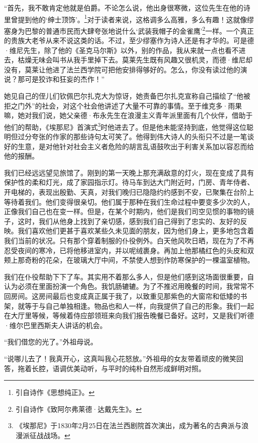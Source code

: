 \par “首先，我不敢肯定他就是伯爵。不论怎么说，他出身很寒微，这位先生在他的诗里曾提到他的‘绅士顶饰’。\footnote{引自诗作《思想纯正》。}对于读者来说，这格调多么高雅，多么有趣！这就像缪塞身为巴黎的普通市民而大肆夸张地说什么‘武装我帽子的金雀鹰’\footnote{引自诗作《致阿尔弗莱德·达戴先生》。}一样。一个真正的贵族大老爷从来不说这类的话。不过，至少缪塞作为诗人还是有才华的。可是德·维尼先生，除了他的《圣克马尔斯》以外，别的作品，我从来就一点也看不进去，枯燥无味会叫书从我手里掉下去。莫莱先生既有风趣又很机灵，而德·维尼却没有，莫莱让他进了法兰西学院可把他安排得够好的。怎么，你没有读过他的演说？那可是狡诈和狂妄的杰作！”
\par 她见自己的侄儿们钦佩巴尔扎克大为惊讶，她责备巴尔扎克宣称自己描绘了“他被拒之门外”的社会，对这个社会他讲述了大量不可靠的事情。至于维克多·雨果嘛，她对我们说，她父亲德·布永先生在浪漫主义青年派里面有几个伙伴，借助于他们的帮助，《埃那尼》首演式\footnote{《埃那尼》于1830年2月25日在法兰西剧院首次演出，成为著名的古典派与浪漫派征战战场。}时他进去了。但是他未能坚持到底，他觉得这位聪明但过分夸张的作家的那些诗句太可笑了。他得到伟大诗人的头衔只不过是一笔谈好的生意，是对他针对社会主义者危险的胡言乱语鼓吹出于利害关系加以容忍而给他的报酬。
\par 我们已经远远望见旅馆了。刚到的第一天晚上那充满敌意的灯火，现在变成了具有保护性的柔和灯光，成了家园指示灯。待马车到达大门附近时，门房、青年侍者、开电梯的，表现出殷勤、天真，对我们晚归已隐隐约约感到不安，已聚集在台阶上等待着我们。他们变得很亲切。他们属于那种在我们生命过程中要变多少次的人，正像我们自己也在变一样。但是，在某个时期内，他们是我们司空见惯的事物的镜子，这时，我们从他身上找到了亲切感，感到我们自己得到了忠实的、友好的反映。我们喜欢他们更甚于喜欢某些久未见面的朋友，因为他们身上，更多地包含着我们当前的状况。只有那个穿着制服的仆役例外。白天他风吹日晒，现在为了不再忍受夜间的寒冷，已将他移进室内，并以呢绒裹身。再加上他那橘红色的头皮和双颊上那奇粉的花朵，在玻璃大厅中间，不禁使人想到作防寒保护的一棵温室植物。
\par 我们在仆役帮助下下了车。其实用不着那么多人，但是他们感到这场面很重要，自认为必须在里面扮演一个角色。我饥肠辘辘。为了不推迟用晚餐的时间，我常常不回房间。这房间最后也变成真正属于我了，以致重见那紫色的大窗帘和低矮的书架，就等于与自己单独相逢。物品也和人一样，向我提供了自己的形象。我们一起在大厅里等候，等候着侍应部领班来向我们报告晚餐已备好。这时，又是我们听德·维尔巴里西斯夫人讲话的机会。
\par “我们借您的光了。”外祖母说。
\par “说哪儿去了！我真开心，这真叫我心花怒放。”外祖母的女友带着顽皮的微笑回答，拖着长腔，语调优美动听，与平时的纯朴自然形成鲜明对照。
